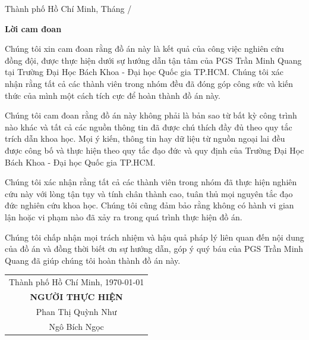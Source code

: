 \documentclass[12pt, a4paper]{report}
\theoremstyle{definition}
\newenvironment{declaration}{
	\begin{center}
	  {\bfseries Lời cam đoan}
	\end{center}
	\quotation
  }{}
\newcommand{\Proc}{PGS Trần Minh Quang }
\newcommand{\Uni}{Trường Đại Học Bách Khoa - Đại học Quốc gia TP.HCM}
\begin{document}
\begin{titlepage}
\begin{table}[h]
\begin{tabular}{rll}
\end{tabular}
\end{table}
\vspace{1cm}

\begin{center}
{\large Thành phố Hồ Chí Minh, Tháng \the\month/\the\year}
\end{center}
\end{titlepage}



\begin{declaration}

Chúng tôi xin cam đoan rằng đồ án này là kết quả của công việc nghiên cứu đồng đội, được thực hiện dưới sự hướng dẫn tận tâm của \Proc tại \Uni. Chúng tôi xác nhận rằng tất cả các thành viên trong nhóm đều đã đóng góp công sức và kiến thức của mình một cách tích cực để hoàn thành đồ án này.

Chúng tôi cam đoan rằng đồ án này không phải là bản sao từ bất kỳ công trình nào khác và tất cả các nguồn thông tin đã được chú thích đầy đủ theo quy tắc trích dẫn khoa học. Mọi ý kiến, thông tin hay dữ liệu từ nguồn ngoại lai đều được công bố và thực hiện theo quy tắc đạo đức và quy định của \Uni.

Chúng tôi xác nhận rằng tất cả các thành viên trong nhóm đã thực hiện nghiên cứu này với lòng tận tụy và tính chân thành cao, tuân thủ mọi nguyên tắc đạo đức nghiên cứu khoa học. Chúng tôi cũng đảm bảo rằng không có hành vi gian lận hoặc vi phạm nào đã xảy ra trong quá trình thực hiện đồ án.

Chúng tôi chấp nhận mọi trách nhiệm và hậu quả pháp lý liên quan đến nội dung của đồ án và đồng thời biết ơn sự hướng dẫn, góp ý quý báu của \Proc  đã giúp chúng tôi hoàn thành đồ án này.

\begin{flushright}

    \begin{tabular}{@{}c@{}}
    Thành phố Hồ Chí Minh, \today \\
    \textbf{NGƯỜI THỰC HIỆN} \\
    Phan Thị Quỳnh Như \\
    Ngô Bích Ngọc
    \end{tabular}

\end{flushright}
\end{declaration}

\newpage
\end{document}
